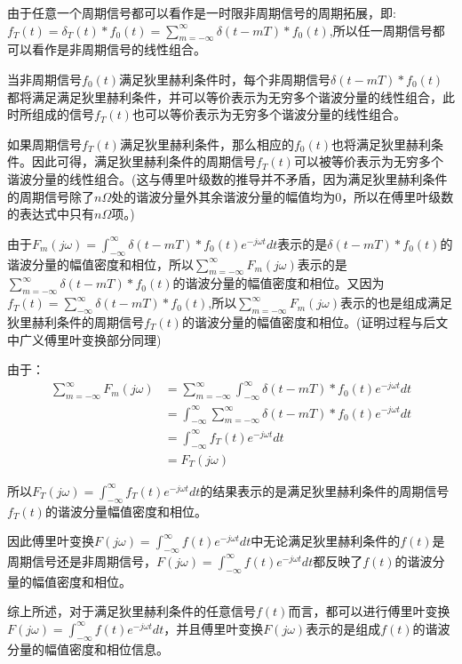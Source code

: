 \documentclass{article}
\numberwithin{equation}{section}
\numberwithin{figure}{section}
\begin{document}
由于任意一个周期信号都可以看作是一时限非周期信号的周期拓展，即:$f_T(t)=\delta_T(t)*f_0(t)=\sum_{m=-\infty}^{\infty}\delta(t-mT)*f_0(t)$,所以任一周期信号都可以看作是非周期信号的线性组合。

当非周期信号$f_0(t)$满足狄里赫利条件时，每个非周期信号$\delta(t-mT)*f_0(t)$都将满足满足狄里赫利条件，并可以等价表示为无穷多个谐波分量的线性组合，此时所组成的信号$f_T(t)$也可以等价表示为无穷多个谐波分量的线性组合。

如果周期信号$f_T(t)$满足狄里赫利条件，那么相应的$f_0(t)$也将满足狄里赫利条件。因此可得，满足狄里赫利条件的周期信号$f_T(t)$可以被等价表示为无穷多个谐波分量的线性组合。(这与傅里叶级数的推导并不矛盾，因为满足狄里赫利条件的周期信号除了$n\Omega$处的谐波分量外其余谐波分量的幅值均为0，所以在傅里叶级数的表达式中只有$n\Omega$项。)

由于$F_m(j\omega)=\int_{-\infty}^{\infty}\delta(t-mT)*f_0(t)e^{-j\omega t}dt$表示的是$\delta(t-mT)*f_0(t)$的谐波分量的幅值密度和相位，所以$\sum_{m=-\infty}^{\infty}F_m(j\omega)$表示的是$\sum_{m=-\infty}^{\infty}\delta(t-mT)*f_0(t)$的谐波分量的幅值密度和相位。又因为$f_T(t)=\sum_{-\infty}^{\infty}\delta(t-mT)*f_0(t)$,所以$\sum_{m=-\infty}^{\infty}F_m(j\omega)$表示的也是组成满足狄里赫利条件的周期信号$f_T(t)$的谐波分量的幅值密度和相位。(证明过程与后文中广义傅里叶变换部分同理)

由于：
\begin{equation}
    \begin{split}
        \sum_{m=-\infty}^{\infty}F_m(j\omega)&=\sum_{m=-\infty}^{\infty}\int_{-\infty}^{\infty}\delta(t-mT)*f_0(t)e^{-j\omega t}dt\\
        &=\int_{-\infty}^{\infty}\sum_{m=-\infty}^{\infty}\delta(t-mT)*f_0(t)e^{-j\omega t}dt\\
        &=\int_{-\infty}^{\infty}f_T(t)e^{-j\omega t}dt\\
        &=F_T(j\omega)
    \end{split}
\end{equation}

所以$F_T(j\omega)=\int_{-\infty}^{\infty}f_T(t)e^{-j\omega t}dt$的结果表示的是满足狄里赫利条件的周期信号$f_T(t)$的谐波分量幅值密度和相位。

因此傅里叶变换$F(j\omega)=\int_{-\infty}^{\infty}f(t)e^{-j\omega t}dt$中无论满足狄里赫利条件的$f(t)$是周期信号还是非周期信号，$F(j\omega)=\int_{-\infty}^{\infty}f(t)e^{-j\omega t}dt$都反映了$f(t)$的谐波分量的幅值密度和相位。

综上所述，对于满足狄里赫利条件的任意信号$f(t)$而言，都可以进行傅里叶变换$F(j\omega)=\int_{-\infty}^{\infty}f(t)e^{-j\omega t}dt$，并且傅里叶变换$F(j\omega)$表示的是组成$f(t)$的谐波分量的幅值密度和相位信息。
\end{document}
